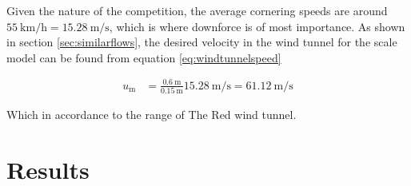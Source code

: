 Given the nature of the competition, the average cornering speeds are around $\SI{55}{\kilo \meter \per \hour} = \SI{15.28}{\metre\per\second}$, which is where downforce is of most importance. As shown in section \ref{sec:similarflows}, the desired velocity in the wind tunnel for the scale model can be found from equation \ref{eq:windtunnelspeed}

\begin{align*}
  u_\text{m} &= \frac{\SI{0.6}{\metre}}{\SI{0.15}{\metre}} \SI{15.28}{\metre\per\second} = \SI{61.12}{\metre\per\second}
\end{align*}

Which in accordance to the range of The Red wind tunnel.


\section{Results}
